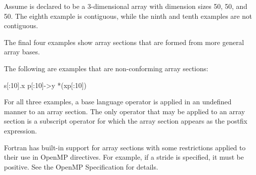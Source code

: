 \begin{ccppspecific}
Assume  is declared to be a 3-dimensional array with dimension
sizes 50, 50, and 50.  The eighth example is contiguous, while the ninth
and tenth examples are not contiguous.

The final four examples show array sections that are formed from
more general array bases.

The following are examples that are non-conforming array sections:

\begin{boxedcode}
s[:10].x
p[:10]->y
*(xp[:10])
\end{boxedcode}

For all three examples, a base language operator is applied in an
undefined manner to an array section. The only operator that may be
applied to an array section is a subscript operator for which the
array section appears as the postfix expression.
\end{ccppspecific}

\begin{fortranspecific}
Fortran has built-in support for array sections with some
restrictions applied to their use in OpenMP directives.
For example, if a stride is specified, it must be positive.
See the OpenMP Specification for details.
\end{fortranspecific}
